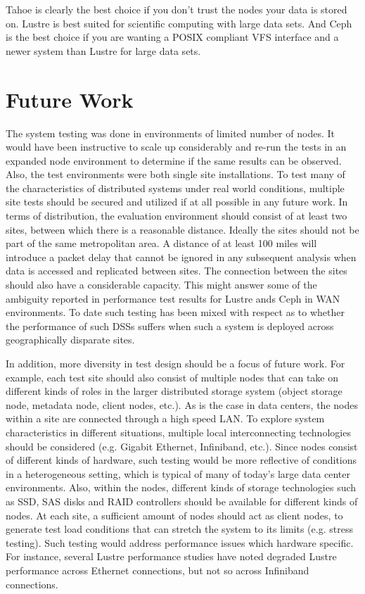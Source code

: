 \documentclass[11pt]{article}
\begin{document}
Tahoe is clearly the best choice if you don't trust the nodes your data is stored on. Lustre is best suited for scientific computing with large data sets. And Ceph is the best choice if you are wanting a POSIX compliant VFS interface and a newer system than Lustre for large data sets. 

\section{Future Work}

The system testing was done in environments of limited number of 
nodes. It would have been instructive to scale up considerably and 
re-run the tests in an expanded node environment to determine if 
the same results can be observed. Also, the test environments were 
both single site installations. To test many of the characteristics 
of distributed systems under real world conditions, multiple site 
tests should be secured and utilized if at all possible in any future 
work. In terms of distribution, the evaluation environment should 
consist of at least two sites, between which there is a reasonable 
distance. Ideally the sites should not be part of the same 
metropolitan area. A distance of at least 100 miles will introduce 
a packet delay that cannot be ignored in any subsequent analysis when
data is accessed and replicated between sites. The connection between 
the sites should also have a considerable capacity. This might answer 
some of the ambiguity reported in performance test results for Lustre 
ands Ceph in WAN environments. To date such testing has been mixed with 
respect as to whether the performance of such DSSs suffers when such a 
system is deployed across geographically disparate sites. 

In addition, more diversity in test design should be a focus of future 
work. For example, each test site should also consist of multiple nodes 
that can take on different kinds of roles in the larger distributed 
storage system (object storage node, metadata node, client nodes, etc.). 
As is the case in data centers, the nodes within a site are connected 
through a high speed LAN. To explore system characteristics in different 
situations, multiple local interconnecting technologies should be 
considered (e.g. Gigabit Ethernet, Infiniband, etc.). Since nodes 
consist of different kinds of hardware, such testing would be more 
reflective of conditions in a heterogeneous setting, which is typical 
of many of today’s large data center environments. Also, within the 
nodes, different kinds of storage technologies such as SSD, SAS disks 
and RAID controllers should be available for different kinds of nodes. 
At each site, a sufficient amount of nodes should act as client nodes, 
to generate test load conditions that can stretch the system to its 
limits (e.g. stress testing). Such testing would address performance 
issues which hardware specific. For instance, several Lustre performance 
studies have noted degraded Lustre performance across Ethernet connections,
but not so across Infiniband connections.
\end{document}
